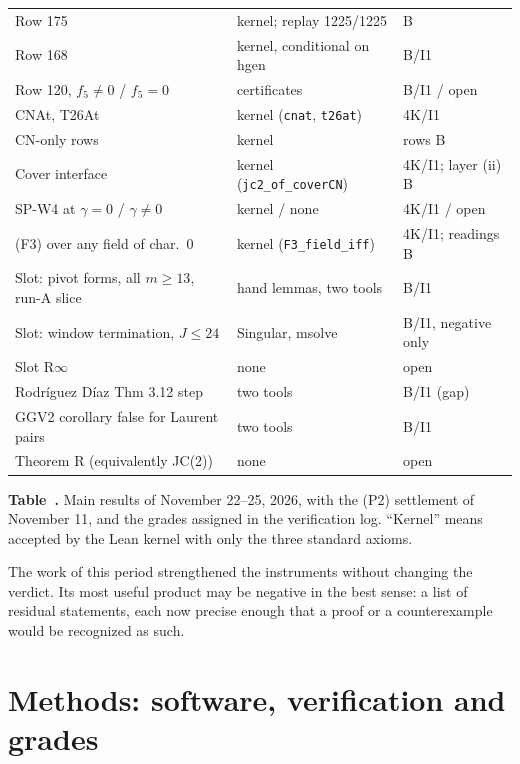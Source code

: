 \documentclass[a4paper,11pt]{article}
\newcommand{\sttag}[3]{{\setlength{\fboxsep}{1.2pt}\colorbox{#1}{\textcolor{#2}{\footnotesize #3}}}}
\newcommand{\stproved}[1]{\sttag{truebg}{truetext}{#1}}
\newcommand{\stopen}[1]{\sttag{openbg}{opentext}{#1}}
\renewcommand{\thesection}{\arabic{section}}
\renewcommand{\theHsection}{\thepart.\arabic{section}}
\theoremstyle{jsplain}
\theoremstyle{jsdef}
\theoremstyle{jsrem}
\begin{document}
\begin{center}
\begin{tabular}{@{}>{\raggedright\arraybackslash}p{5.6cm}>{\raggedright\arraybackslash}p{5.2cm}>{\raggedright\arraybackslash}p{3.2cm}@{}}
Row 175 & kernel; replay 1225/1225 & B\\
Row 168 & kernel, conditional on hgen & B/I1\\
Row 120, $f_5\ne0$ / $f_5=0$ & certificates & B/I1 / \stopen{open}\\
CNAt, T26At & kernel (\texttt{cnat}, \texttt{t26at}) & \stproved{4K/I1}\\
193 CN-only rows & kernel & rows B\\
Cover interface & kernel (\texttt{jc2\_\allowbreak{}of\_\allowbreak{}coverCN}) & \stproved{4K/I1}; layer (ii) B\\
SP-W4 at $\gamma=0$ / $\gamma\ne0$ & kernel / none & \stproved{4K/I1} / \stopen{open}\\
(F3) over any field of char.~0 & kernel (\texttt{F3\_\allowbreak{}field\_\allowbreak{}iff}) & \stproved{4K/I1}; readings B\\
Slot: pivot forms, all $m\ge13$, run-A slice & hand lemmas, two tools & B/I1\\
Slot: window termination, $J\le24$ & Singular, msolve & B/I1, negative only\\
Slot R$\infty$ & none & \stopen{open}\\
Rodríguez Díaz Thm 3.12 step & two tools & B/I1 (gap)\\
GGV2 corollary false for Laurent pairs & two tools & B/I1\\
Theorem R (equivalently JC(2)) & none & \stopen{open}\\
\bottomrule
\end{tabular}

\smallskip
{\footnotesize\textcolor{truetext}{\bfseries Table~\thetable.} \textcolor{inksecondary}{Main results of November 22--25, 2026, with the (P2) settlement of November 11, and the grades assigned in the verification log. ``Kernel'' means accepted by the Lean kernel with only the three standard axioms.}}
\end{center}

The work of this period strengthened the instruments without changing the verdict. Its most useful product may be negative in the best sense: a list of residual statements, each now precise enough that a proof or a counterexample would be recognized as such.

\appendix
\renewcommand{\thesection}{\Alph{section}}
\renewcommand{\theHsection}{app.\Alph{section}}
\section{Methods: software, verification and grades}\label{app:methods}
\end{document}

